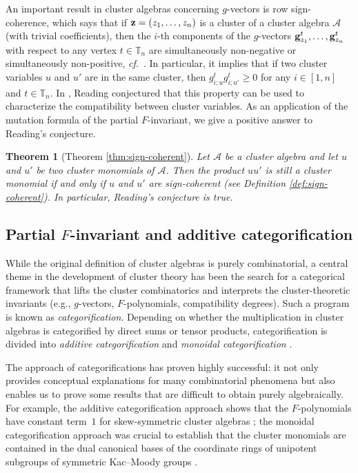 \documentclass[12pt]{amsart}
\newtheorem{theorem}{Theorem}[section]
\theoremstyle{definition}
\theoremstyle{remark}
\numberwithin{equation}{section}
\newcommand{\confer}{\textit{cf.}\ }
\begin{document}
An important result in cluster algebras concerning $g$-vectors is row sign-coherence, which says that if ${\bf z}=(z_1,\ldots,z_n)$ is a cluster of a cluster algebra $\mathcal A$ (with trivial coefficients), then the $i$-th components of the $g$-vectors ${\bf g}_{z_1}^{t},\ldots, {\bf g}_{z_n}^{t}$ with respect to any vertex $t\in\mathbb T_n$ are simultaneously
non-negative or simultaneously non-positive, \confer \cite{GHKK18}. In particular, it implies that if two cluster variables $u$ and $u'$ are in the same cluster, then $g_{i;u}^tg_{i;u'}^t\geq 0$ for any $i\in[1,n]$ and $t\in\mathbb T_n$. In \cite[Conjecture 8.21]{Reading-2014}, Reading conjectured that this property can be used to characterize the compatibility between cluster variables. As an application of the mutation formula of the partial $F$-invariant, we give a positive answer to Reading's conjecture.


\begin{theorem}[Theorem \ref{thm:sign-coherent}]
\label{main-thm:sign-coherent} Let $\mathcal A$ be a cluster algebra and let $u$ and $u'$ be two cluster monomials of $\mathcal A$. Then 
    the product $uu'$ is still a cluster monomial if and only if  $u$ and $u'$ are sign-coherent (see Definition \ref{def:sign-coherent}). In particular, Reading's conjecture is true.
\end{theorem}


\subsection{Partial $F$-invariant and additive categorification}
While the original definition of cluster algebras is purely combinatorial, a central theme in the development of cluster theory has been the search for a categorical framework that lifts the cluster combinatorics and interprets the cluster-theoretic invariants (e.g., $g$-vectors, $F$-polynomials, compatibility degrees). Such a program is known as {\em categorification}. Depending on whether the multiplication in cluster algebras is categorified by direct sums or tensor products, categorification is divided into {\em additive categorification} \cite{bmrrt_2006,DWZ10, BIRSm11,gls_2011,Amiot_2009,Plamondon-2011} and {\em monoidal categorification} \cite{HL_2010,HL16,kkko-2018,kkop-2024}.

The approach of categorifications has proven highly successful: it not only provides conceptual explanations for many combinatorial phenomena but also enables us to prove some results that are difficult to obtain purely algebraically. For example, the additive categorification approach shows that the $F$-polynomials have constant term~$1$ for skew-symmetric cluster algebras \cite{DWZ10}; the monoidal categorification approach was crucial to establish that the cluster monomials are contained in the dual canonical bases of the coordinate rings of unipotent subgroups of symmetric Kac--Moody groups \cite{kkko-2018}.
\end{document}
